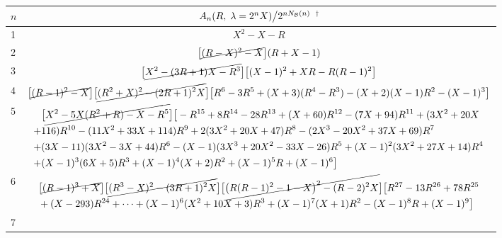 \documentclass{ws-ijbc}
\begin{document}
\begin{table}[h]\footnotesize
{
\begin{tabular}{lc}
\hline
  $n$
& $A_n(R, \; \lambda = 2^n X)
  \big\slash
   2^{n N_\mathcal B(n)}$ $^\dagger$
\\
\hline
1
&
$X^2-X-R$
\\
2
&
  $
  \big[ \cancel{(R-X)^2 - X}\big]
  (R + X - 1)
  $
\\
3
&
$\begin{aligned}
\big[\cancel{
  X^2-(3R+1)X-R^3
}\big]
  \big[
  (X-1)^2
 + X R
 - R(R-1)^2
  \big]
\end{aligned}$
\\
4
&
$\begin{aligned}
\big[ \cancel{
  (R-1)^2 - X
} \big]
\big[ \cancel{
(R^2+X)^2 -(2R+1)^2 X
} \big]
\big[
  R^6-3 R^5+(X+3) (R^4 - R^3) -(X+2)(X-1) R^2 - (X-1)^3
\big]
\end{aligned}$
\\
5
&
\begin{minipage}{.97\linewidth}
\vspace*{2mm}
$\begin{aligned}
&\big[ \cancel{
  X^2-5 X (R^2+R)-X - R^5
} \big]
\big[
-R^{15}+8 R^{14}-28 R^{13}+(X+60) R^{12}-(7 X+94) R^{11}
+(3 X^2 +20 X
\\
+&116) R^{10}
-(11 X^2+33 X+114) R^9
+2(3 X^2+20 X+47) R^8
-(2 X^3-20 X^2+37 X+69) R^7 \\
+&(3 X-11)(3X^2-3X+44) R^6
-(X-1) (3 X^3+20 X^2-33 X-26) R^5
+(X-1)^2 (3 X^2+27 X+14) R^4 \\
+&(X-1)^3 (6 X+5) R^3
+(X-1)^4 (X+2) R^2+(X-1)^5 R+(X-1)^6
\big]
\end{aligned}$
\vspace{1mm}
\end{minipage}
\\
6
&
$\begin{aligned}
&\big[\cancel {
  (R-1)^3 + X
}\big]
\big[\cancel {
 (R^3 - X)^2 - (3R+1)^2 X
}\big]
\big[\cancel {
\big(R(R-1)^2-1-X\big)^2-(R-2)^2 X
}\big]
\big[
R^{27}-13 R^{26}+78 R^{25}\\
&+(X-293) R^{24}
+\dots
+(X-1)^6 (X^2+10 X+3) R^3
+(X-1)^7 (X+1) R^2-(X-1)^8 R+(X-1)^9
\big]
\end{aligned}$
\\
7

\end{tabular}}
\end{table}
\end{document}
